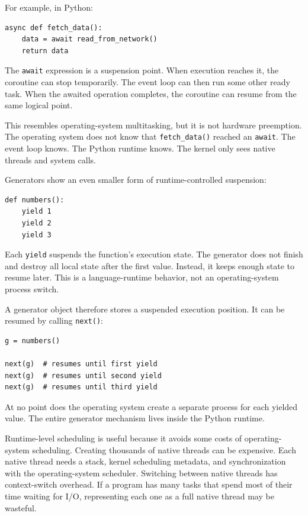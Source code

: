 For example, in Python:

\begin{verbatim}
async def fetch_data():
    data = await read_from_network()
    return data
\end{verbatim}

The \texttt{await} expression is a suspension point. When execution reaches it, the coroutine can stop temporarily. The event loop can then run some other ready task. When the awaited operation completes, the coroutine can resume from the same logical point.

This resembles operating-system multitasking, but it is not hardware preemption. The operating system does not know that \texttt{fetch\_data()} reached an \texttt{await}. The event loop knows. The Python runtime knows. The kernel only sees native threads and system calls.

Generators show an even smaller form of runtime-controlled suspension:

\begin{verbatim}
def numbers():
    yield 1
    yield 2
    yield 3
\end{verbatim}

Each \texttt{yield} suspends the function's execution state. The generator does not finish and destroy all local state after the first value. Instead, it keeps enough state to resume later. This is a language-runtime behavior, not an operating-system process switch.

A generator object therefore stores a suspended execution position. It can be resumed by calling \texttt{next()}:

\begin{verbatim}
g = numbers()

next(g)  # resumes until first yield
next(g)  # resumes until second yield
next(g)  # resumes until third yield
\end{verbatim}

At no point does the operating system create a separate process for each yielded value. The entire generator mechanism lives inside the Python runtime.

Runtime-level scheduling is useful because it avoids some costs of operating-system scheduling. Creating thousands of native threads can be expensive. Each native thread needs a stack, kernel scheduling metadata, and synchronization with the operating-system scheduler. Switching between native threads has context-switch overhead. If a program has many tasks that spend most of their time waiting for I/O, representing each one as a full native thread may be wasteful.

